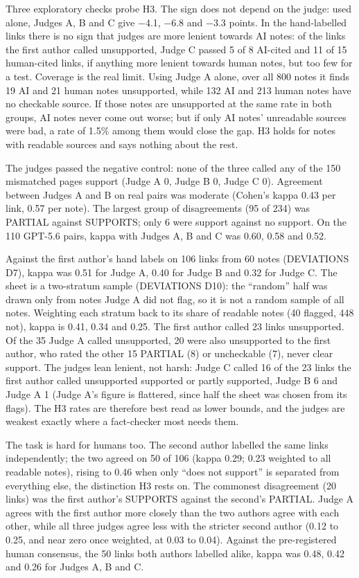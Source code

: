 \documentclass[10.5pt]{article}
\begin{document}
Three exploratory checks probe H3. The sign does not depend on the judge: used alone, Judges A, B and C give −4.1, −6.8 and −3.3 points. In the hand-labelled links there is no sign that judges are more lenient towards AI notes: of the links the first author called unsupported, Judge C passed 5 of 8 AI-cited and 11 of 15 human-cited links, if anything more lenient towards human notes, but too few for a test. Coverage is the real limit. Using Judge A alone, over all 800 notes it finds 19 AI and 21 human notes unsupported, while 132 AI and 213 human notes have no checkable source. If those notes are unsupported at the same rate in both groups, AI notes never come out worse; but if only AI notes' unreadable sources were bad, a rate of 1.5\% among them would close the gap. H3 holds for notes with readable sources and says nothing about the rest.

The judges passed the negative control: none of the three called any of the 150 mismatched pages support (Judge A 0, Judge B 0, Judge C 0). Agreement between Judges A and B on real pairs was moderate (Cohen's kappa 0.43 per link, 0.57 per note). The largest group of disagreements (95 of 234) was PARTIAL against SUPPORTS; only 6 were support against no support. On the 110 GPT-5.6 pairs, kappa with Judges A, B and C was 0.60, 0.58 and 0.52.

Against the first author's hand labels on 106 links from 60 notes (DEVIATIONS D7), kappa was 0.51 for Judge A, 0.40 for Judge B and 0.32 for Judge C. The sheet is a two-stratum sample (DEVIATIONS D10): the ``random'' half was drawn only from notes Judge A did not flag, so it is not a random sample of all notes. Weighting each stratum back to its share of readable notes (40 flagged, 448 not), kappa is 0.41, 0.34 and 0.25. The first author called 23 links unsupported. Of the 35 Judge A called unsupported, 20 were also unsupported to the first author, who rated the other 15 PARTIAL (8) or uncheckable (7), never clear support. The judges lean lenient, not harsh: Judge C called 16 of the 23 links the first author called unsupported supported or partly supported, Judge B 6 and Judge A 1 (Judge A's figure is flattered, since half the sheet was chosen from its flags). The H3 rates are therefore best read as lower bounds, and the judges are weakest exactly where a fact-checker most needs them.

The task is hard for humans too. The second author labelled the same links independently; the two agreed on 50 of 106 (kappa 0.29; 0.23 weighted to all readable notes), rising to 0.46 when only ``does not support'' is separated from everything else, the distinction H3 rests on. The commonest disagreement (20 links) was the first author's SUPPORTS against the second's PARTIAL. Judge A agrees with the first author more closely than the two authors agree with each other, while all three judges agree less with the stricter second author (0.12 to 0.25, and near zero once weighted, at 0.03 to 0.04). Against the pre-registered human consensus, the 50 links both authors labelled alike, kappa was 0.48, 0.42 and 0.26 for Judges A, B and C.
\end{document}

